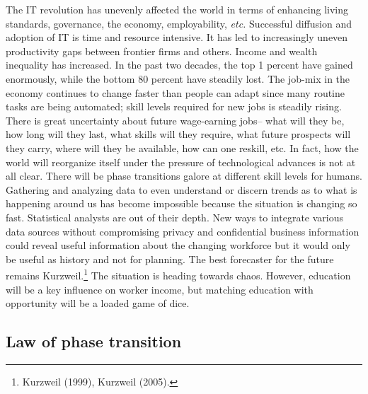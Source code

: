 \begin{multicols}{2}
The IT revolution has unevenly affected the world in terms of enhancing living standards, governance, the economy, employability, \textit{etc.} Successful diffusion and adoption of IT is time and resource intensive. It has led to increasingly uneven productivity gaps between frontier firms and others. Income and wealth inequality has increased. In the past two decades, the top 1 percent have gained enormously, while the bottom 80 percent have steadily lost. The job-mix in the economy continues to change faster than people can adapt since many routine tasks are being automated; skill levels required for new jobs is steadily rising. There is great uncertainty about future wage-earning jobs-- what will they be, how long will they last, what skills will they require, what future prospects will they carry, where will they be available, how can one reskill, etc. In fact, how the world will reorganize itself under the pressure of technological advances is not at all clear. There will be phase transitions galore at different skill levels for humans. Gathering and analyzing data to even understand or discern trends as to what is happening around us has become impossible because the situation is changing so fast. Statistical analysts are out of their depth. New ways to integrate various data sources without compromising privacy and confidential business information could reveal useful information about the changing workforce but it would only be useful as history and not for planning. The best forecaster for the future remains Kurzweil.\footnote{Kurzweil (1999), Kurzweil (2005).} The situation is heading towards chaos. However, education will be a key influence on worker income, but matching education with opportunity will be a loaded game of dice.

\subsection{Law of phase transition}


\end{multicols}
